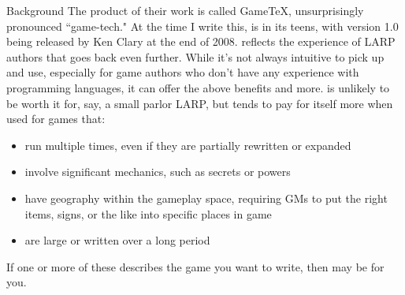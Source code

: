 \documentclass{article}
\begin{document}
\begin{section}{Background}
The product of their work is called GameTeX, unsurprisingly pronounced ``game-tech." At the time I write this, \gametex{} is in its teens, with version 1.0 being released by Ken Clary at the end of 2008.  \gametex{} reflects the experience of LARP authors that goes back even further.  While it's not always intuitive to pick up and use, especially for game authors who don't have any experience with programming languages, it can offer the above benefits and more.  \gametex{} is unlikely to be worth it for, say, a small parlor LARP, but tends to pay for itself more when used for games that:
\begin{itemize}
\item run multiple times, even if they are partially rewritten or expanded
\item involve significant mechanics, such as secrets or powers
\item have geography within the gameplay space, requiring GMs to put the right items, signs, or the like into specific places in game
\item are large or written over a long period
\end{itemize}

If one or more of these describes the game you want to write, then \gametex{} may be for you.
\end{section}
\end{document}
